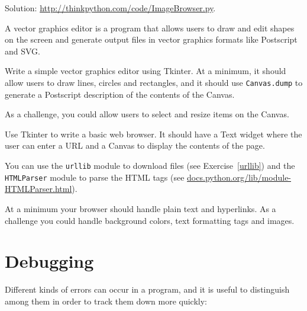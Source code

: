 \documentclass[10pt]{book}
\begin{document}
\begin{CJK}{UTF8}{gbsn}
\begin{exercise}
\begin{enumerate}
\end{enumerate}

Solution: \url{http://thinkpython.com/code/ImageBrowser.py}.

\end{exercise}


\begin{exercise}

A vector graphics editor is a program that allows users to draw and
edit shapes on the screen and generate output files in vector graphics
formats like Postscript and SVG.

Write a simple vector graphics editor using Tkinter.  At a
minimum, it should allow users to draw lines, circles and
rectangles, and it should use {\tt Canvas.dump} to
generate a Postscript description of the contents of the
Canvas.

As a challenge, you could allow users to select and resize
items on the Canvas.


\end{exercise}


\begin{exercise}

Use Tkinter to write a basic web browser.  It
should have a Text widget where the user can enter a URL
and a Canvas to display the contents of the page.

You can use the {\tt urllib} module to download files
(see Exercise~\ref{urllib}) and
the {\tt HTMLParser} module to parse the HTML
tags (see \url{docs.python.org/lib/module-HTMLParser.html}).

At a minimum your browser should handle plain text and hyperlinks.  As
a challenge you could handle background colors, text
formatting tags and images.


\end{exercise}



\appendix

\chapter{Debugging}

Different kinds of errors can occur
in a program, and it is useful to distinguish among them
in order to track them down more quickly:


\end{CJK}
\end{document}
